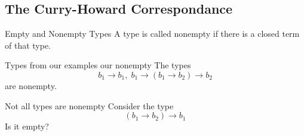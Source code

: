\documentclass[
	aspectratio=169, %
	8pt, %
]{beamer}
\begin{document}
\subsection{The Curry-Howard Correspondance}
\begin{frame}{\insertsubsection}
		\begin{definition}{Empty and Nonempty Types}
				A type is called nonempty if there is a closed term of that type.
		\end{definition}
				\begin{example}{Types from our examples our nonempty}
				The types
				\begin{equation*}
						b_1 \rightarrow b_1, \; b_1 \rightarrow (b_1 \rightarrow b_2) \rightarrow b_2
				\end{equation*}
				are nonempty.
			\end{example}
		\begin{note}{Not all types are nonempty}
			Consider the type
			\begin{equation*}
					(b_1 \rightarrow b_2) \rightarrow b_1
			\end{equation*}
					Is it empty?
		\end{note}
\end{frame}
\end{document}
